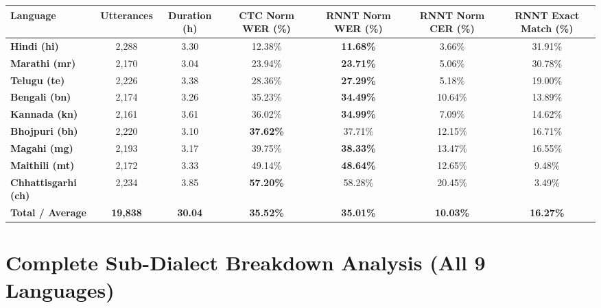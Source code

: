 \documentclass[10pt]{article}
\begin{document}
\begin{table}[h!]
\centering
\small
\setlength{\tabcolsep}{5pt}
\begin{tabular}{lcccccc}
\toprule
\textbf{Language} & \textbf{Utterances} & \textbf{Duration (h)} & \textbf{CTC Norm WER (\%)} & \textbf{RNNT Norm WER (\%)} & \textbf{RNNT Norm CER (\%)} & \textbf{RNNT Exact Match (\%)} \\
\midrule
\textbf{Hindi (hi)}        & 2,288 & 3.30 & 12.38\% & \textbf{11.68\%} & 3.66\% & 31.91\% \\
\textbf{Marathi (mr)}      & 2,170 & 3.04 & 23.94\% & \textbf{23.71\%} & 5.06\% & 30.78\% \\
\textbf{Telugu (te)}       & 2,226 & 3.38 & 28.36\% & \textbf{27.29\%} & 5.18\% & 19.00\% \\
\textbf{Bengali (bn)}      & 2,174 & 3.26 & 35.23\% & \textbf{34.49\%} & 10.64\% & 13.89\% \\
\textbf{Kannada (kn)}      & 2,161 & 3.61 & 36.02\% & \textbf{34.99\%} & 7.09\% & 14.62\% \\
\textbf{Bhojpuri (bh)}     & 2,220 & 3.10 & \textbf{37.62\%} & 37.71\% & 12.15\% & 16.71\% \\
\textbf{Magahi (mg)}       & 2,193 & 3.17 & 39.75\% & \textbf{38.33\%} & 13.47\% & 16.55\% \\
\textbf{Maithili (mt)}     & 2,172 & 3.33 & 49.14\% & \textbf{48.64\%} & 12.65\% & 9.48\% \\
\textbf{Chhattisgarhi (ch)}& 2,234 & 3.85 & \textbf{57.20\%} & 58.28\% & 20.45\% & 3.49\% \\
\midrule
\textbf{Total / Average}   & \textbf{19,838} & \textbf{30.04} & \textbf{35.52\%} & \textbf{35.01\%} & \textbf{10.03\%} & \textbf{16.27\%} \\
\bottomrule
\end{tabular}
\end{table}

\section*{Complete Sub-Dialect Breakdown Analysis (All 9 Languages)}
\end{document}

